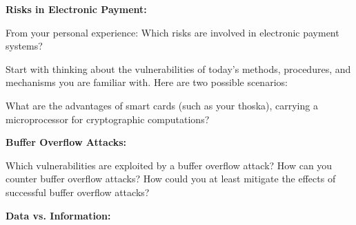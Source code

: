 \documentclass[10pt]{exam}  %
\begin{document}
\begin{questions}
    \question \textbf{Risks in Electronic Payment:}\hfill

    From your personal experience: Which risks are involved in electronic payment systems?

    Start with thinking about the vulnerabilities of today’s methods, procedures, and mechanisms you are familiar with. Here are two possible scenarios:
    What are the advantages of smart cards (such as your thoska), carrying a microprocessor for cryptographic computations?
    \begin{solution}
    \end{solution}

    \question \textbf{Buffer Overflow Attacks:}\hfill

    Which vulnerabilities are exploited by a buffer overflow attack? How can you counter buffer overflow attacks? How could you at least mitigate the effects of successful buffer overflow attacks?
    \begin{solution}
    \end{solution}

    \question \textbf{Data vs. Information:}\hfill

    \begin{solution}
    \end{solution}


\end{questions}
\end{document}
